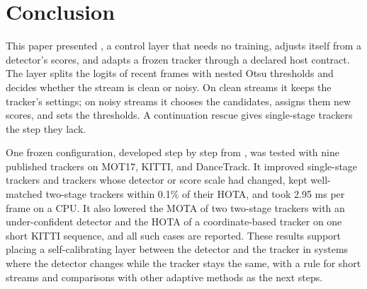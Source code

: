 \section{Conclusion}\label{sec:conclusion}

This paper presented \scl{}, a control layer that needs no training, adjusts
itself from a detector's scores, and adapts a frozen tracker through a
declared host contract. The layer splits the logits of recent frames with
nested Otsu thresholds and decides whether the stream is clean or noisy. On
clean streams it keeps the tracker's settings; on noisy streams it chooses
the candidates, assigns them new scores, and sets the thresholds. A
continuation rescue gives single-stage trackers the step they lack.

One frozen configuration, developed step by step from \aob{}, was tested with
nine published trackers on MOT17, KITTI, and DanceTrack. It improved
single-stage trackers and trackers whose detector or score scale had changed,
kept well-matched two-stage trackers within 0.1\% of their HOTA, and took 2.95
ms per frame on a CPU. It also lowered the MOTA of two two-stage trackers with
an under-confident detector and the HOTA of a coordinate-based tracker on one
short KITTI sequence, and all such cases are reported. These results support
placing a self-calibrating layer between the detector and the tracker in
systems where the detector changes while the tracker stays the same, with a
rule for short streams and comparisons with other adaptive methods as the next
steps.
